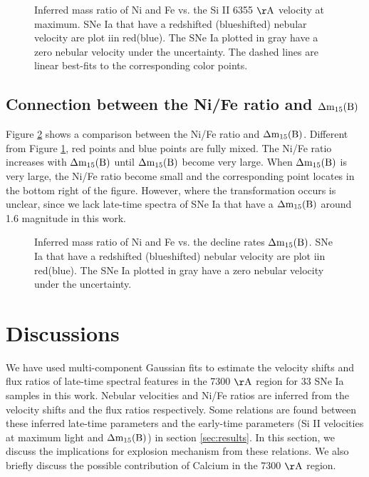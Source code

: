 \documentclass[twocolumn]{aastex631}
\begin{document}
\begin{figure}[ht!]
\caption{Inferred mass ratio of Ni and Fe vs. the Si II 6355 $\rm \AA$ velocity at maximum. SNe Ia that have a redshifted (blueshifted) nebular velocity are plot iin red(blue). The SNe Ia plotted in gray have a zero nebular velocity under the uncertainty. The dashed lines are linear best-fits to the corresponding color points.}
\label{fig:R_Si}
\end{figure}

\subsection{Connection between the Ni/Fe ratio and $\rm {\Delta}m_{15}(B)$ \label{subsec:ratio_15}}

Figure \ref{fig:R_15} shows a comparison between the Ni/Fe ratio and $\rm {\Delta}m_{15}(B)$. Different from Figure \ref{fig:R_Si}, red points and blue points are fully mixed. The Ni/Fe ratio increases with $\rm {\Delta}m_{15}(B)$ until $\rm {\Delta}m_{15}(B)$ become very large. When $\rm {\Delta}m_{15}(B)$ is very large, the Ni/Fe ratio become small and the corresponding point locates in the bottom right of the figure. However, where the transformation occurs is unclear, since we lack late-time spectra of SNe Ia that have a $\rm {\Delta}m_{15}(B)$ around 1.6 magnitude in this work.    

\begin{figure}[ht!]
\caption{Inferred mass ratio of Ni and Fe vs. the decline rates $\rm {\Delta}m_{15}(B)$. SNe Ia that have a redshifted (blueshifted) nebular velocity are plot iin red(blue). The SNe Ia plotted in gray have a zero nebular velocity under the uncertainty.}
\label{fig:R_15}
\end{figure}

\section{Discussions} \label{sec:discussion}

We have used multi-component Gaussian fits to estimate the velocity shifts and flux ratios of late-time spectral features in the 7300 $\rm \AA$ region for 33 SNe Ia samples in this work. Nebular velocities and Ni/Fe ratios are inferred from the velocity shifts and the flux ratios respectively. Some relations are found between these inferred late-time parameters and the early-time parameters (Si II velocities at maximum light and $\rm {\Delta}m_{15}(B)$) in section \ref{sec:results}. In this section, we discuss the implications for explosion mechanism from these relations. We also briefly discuss the possible contribution of Calcium in the 7300 $\rm \AA$ region. 
\end{document}

